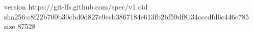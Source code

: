 version https://git-lfs.github.com/spec/v1
oid sha256:c8f22b700b30cbd0d827e9ecb3867184e613fb2bf59df8134cccdfd6c446c785
size 87528
